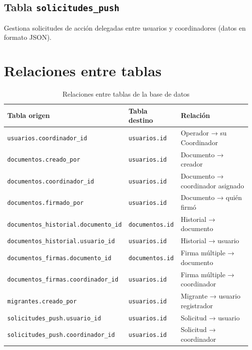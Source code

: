 \documentclass[10pt,letterpaper]{report}
\begin{document}
\subsection{Tabla \texttt{solicitudes\_push}}

Gestiona solicitudes de acción delegadas entre usuarios y coordinadores (datos en formato JSON).

\section{Relaciones entre tablas}

\begin{table}[H]
\centering
\caption{Relaciones entre tablas de la base de datos}
\label{tab:relaciones}
\begin{tabular}{p{} p{} p{}}
\toprule
\textbf{Tabla origen} & \textbf{Tabla destino} & \textbf{Relación} \\
\midrule
\texttt{usuarios.coordinador\_id} & \texttt{usuarios.id} & Operador → su Coordinador \\
\texttt{documentos.creado\_por} & \texttt{usuarios.id} & Documento → creador \\
\texttt{documentos.coordinador\_id} & \texttt{usuarios.id} & Documento → coordinador asignado \\
\texttt{documentos.firmado\_por} & \texttt{usuarios.id} & Documento → quién firmó \\
\texttt{documentos\_historial.documento\_id} & \texttt{documentos.id} & Historial → documento \\
\texttt{documentos\_historial.usuario\_id} & \texttt{usuarios.id} & Historial → usuario \\
\texttt{documentos\_firmas.documento\_id} & \texttt{documentos.id} & Firma múltiple → documento \\
\texttt{documentos\_firmas.coordinador\_id} & \texttt{usuarios.id} & Firma múltiple → coordinador \\
\texttt{migrantes.creado\_por} & \texttt{usuarios.id} & Migrante → usuario registrador \\
\texttt{solicitudes\_push.usuario\_id} & \texttt{usuarios.id} & Solicitud → usuario \\
\texttt{solicitudes\_push.coordinador\_id} & \texttt{usuarios.id} & Solicitud → coordinador \\
\bottomrule
\end{tabular}
\end{table}
\end{document}
